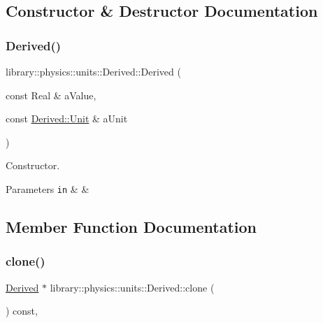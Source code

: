 \subsection{Constructor \& Destructor Documentation}
\mbox{\label{classlibrary_1_1physics_1_1units_1_1_derived_a526996552af20a987c045ced9bd87fc7}} 
\subsubsection{\texorpdfstring{Derived()}{Derived()}}
{\footnotesize\ttfamily library\+::physics\+::units\+::\+Derived\+::\+Derived (\begin{DoxyParamCaption}\item[{const Real \&}]{a\+Value,  }\item[{const \hyperlink{classlibrary_1_1physics_1_1units_1_1_derived_1_1_unit}{Derived\+::\+Unit} \&}]{a\+Unit }\end{DoxyParamCaption})}



Constructor. 


\begin{DoxyCode}
\end{DoxyCode}



\begin{DoxyParams}[1]{Parameters}
\mbox{\tt in}  & {\em } & \\
\hline
\end{DoxyParams}


\subsection{Member Function Documentation}
\mbox{\label{classlibrary_1_1physics_1_1units_1_1_derived_a6328e9f5bcf35f1c587c20f9c3fdb497}} 
\subsubsection{\texorpdfstring{clone()}{clone()}}
{\footnotesize\ttfamily \hyperlink{classlibrary_1_1physics_1_1units_1_1_derived}{Derived} $\ast$ library\+::physics\+::units\+::\+Derived\+::clone (\begin{DoxyParamCaption}{ }\end{DoxyParamCaption}) const\hspace{0.3cm}{\ttfamily [override]}, {\ttfamily [virtual]}}




